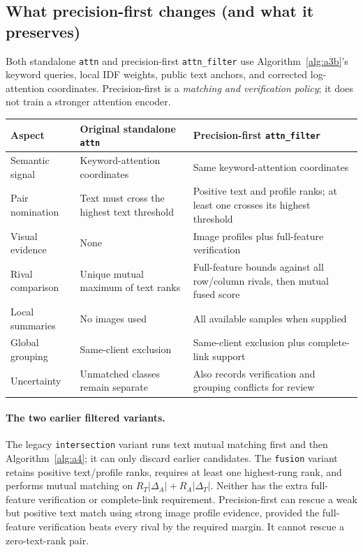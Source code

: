 \documentclass[11pt]{article}
\begin{document}
\begin{algorithm}[H]
\begin{algorithmic}[1]
\end{algorithmic}\end{algorithm}

\clearpage
\subsection*{What precision-first changes (and what it preserves)}
\noindent Both standalone \texttt{attn} and precision-first
\texttt{attn\_filter} use Algorithm~\ref{alg:a3b}'s keyword queries, local IDF
weights, public text anchors, and corrected log-attention coordinates.
Precision-first is a \emph{matching and verification policy}; it does not
train a stronger attention encoder.

\begin{center}\small
\begin{tabular}{@{}>{\raggedright\arraybackslash}p{}>{\raggedright\arraybackslash}p{}>{\raggedright\arraybackslash}p{}@{}}
\toprule
Aspect & Original standalone \texttt{attn} & Precision-first \texttt{attn\_filter}\\\midrule
Semantic signal & Keyword-attention coordinates & Same keyword-attention coordinates\\
Pair nomination & Text must cross the highest text threshold & Positive text and profile ranks; at least one crosses its highest threshold\\
Visual evidence & None & Image profiles plus full-feature verification\\
Rival comparison & Unique mutual maximum of text ranks & Full-feature bounds against all row/column rivals, then mutual fused score\\
Local summaries & No images used & All available samples when supplied\\
Global grouping & Same-client exclusion & Same-client exclusion plus complete-link support\\
Uncertainty & Unmatched classes remain separate & Also records verification and grouping conflicts for review\\
\bottomrule
\end{tabular}
\end{center}

\paragraph{The two earlier filtered variants.}
The legacy \texttt{intersection} variant runs text mutual matching first and
then Algorithm~\ref{alg:a4}; it can only discard earlier candidates.
The \texttt{fusion} variant retains positive text/profile ranks, requires at
least one highest-rung rank, and performs mutual matching on
$R_T|\Delta_A|+R_A|\Delta_T|$.
Neither has the extra full-feature verification or complete-link requirement.
Precision-first can rescue a weak but positive text match using strong image
profile evidence, provided the full-feature verification beats every rival
by the required margin. It cannot rescue a zero-text-rank pair.
\end{document}

